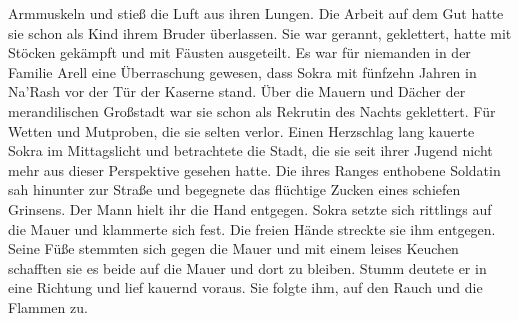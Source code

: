Armmuskeln und stieß die Luft aus ihren Lungen. Die Arbeit auf dem Gut hatte sie schon als Kind 
ihrem Bruder überlassen. Sie war gerannt, geklettert, hatte mit Stöcken gekämpft und mit Fäusten 
ausgeteilt. Es war für niemanden in der Familie Arell eine Überraschung gewesen, dass Sokra mit 
fünfzehn Jahren in Na'Rash vor der Tür der Kaserne stand. Über die Mauern und Dächer der 
merandilischen Großstadt war sie schon als Rekrutin des Nachts geklettert. Für Wetten und 
Mutproben, die sie selten verlor. Einen Herzschlag lang kauerte Sokra im Mittagslicht und 
betrachtete die Stadt, die sie seit ihrer Jugend nicht mehr aus dieser Perspektive gesehen hatte. 
Die ihres Ranges enthobene Soldatin sah hinunter zur Straße und begegnete das flüchtige Zucken 
eines schiefen Grinsens. Der Mann hielt ihr die Hand entgegen. Sokra setzte sich rittlings auf die 
Mauer und klammerte sich fest. Die freien Hände streckte sie ihm entgegen. Seine Füße stemmten sich 
gegen die Mauer und mit einem leises Keuchen schafften sie es beide auf die Mauer und dort zu 
bleiben. Stumm deutete er in eine Richtung und lief kauernd voraus. Sie folgte ihm, auf den Rauch 
und die Flammen zu.\\

